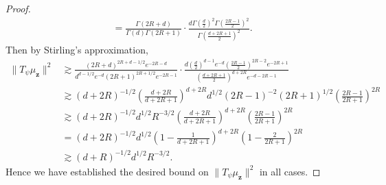 \documentclass{article}
\theoremstyle{definition}
\def\vz{{\bm{z}}}
\begin{document}
\begin{proof}
\begin{align*}
        &= \frac{\Gamma(2R + d) }{\Gamma(d)\Gamma(2R + 1) }\cdot \frac{ d \Gamma\left(\frac{d}{2}\right)^2 \Gamma\left(\frac{2R - 1}{2}\right)^2 }{\Gamma\left(\frac{d + 2R + 1}{2}\right)^2 }.
    \end{align*}
    Then by Stirling's approximation,
    \begin{align*}
        \|T_{\psi}\mu_{\vz}\|^2 &\gtrsim \frac{(2R + d)^{2R + d - 1/2}e^{-2R - d} }{d^{d - 1/2}e^{-d}(2R + 1)^{2R + 1/2}e^{-2R - 1} } \cdot \frac{d \left(\frac{d}{2}\right)^{d -1 }e^{-d}\left(\frac{2R - 1}{2}\right)^{2R - 2}e^{-2R + 1} }{\left(\frac{d + 2R + 1}{2}\right)^{d + 2R } e^{-d - 2R - 1} }\\
        &\gtrsim (d + 2R)^{-1/2}\left(\frac{d + 2R}{d + 2R + 1}\right)^{d + 2R}d^{1/2}(2R - 1)^{-2}(2R + 1)^{1/2}\left(\frac{2R - 1}{2R + 1}\right)^{2R}\\
        &\gtrsim (d + 2R)^{-1/2}d^{1/2} R^{-3/2}\left(\frac{d + 2R}{d + 2R + 1}\right)^{d + 2R}\left(\frac{2R - 1}{2R + 1}\right)^{2R}\\
        &= (d + 2R)^{-1/2} d^{1/2}\left(1 - \frac{1}{d + 2R + 1}\right)^{d + 2R}\left(1 - \frac{2}{2R + 1}\right)^{2R} \\
        &\gtrsim (d + R)^{-1/2}d^{1/2}R^{-3/2}.
    \end{align*}
    Hence we have established the desired bound on $\|T_{\psi}\mu_{\vz}\|^2$ in all cases.
\end{proof}
\end{document}
